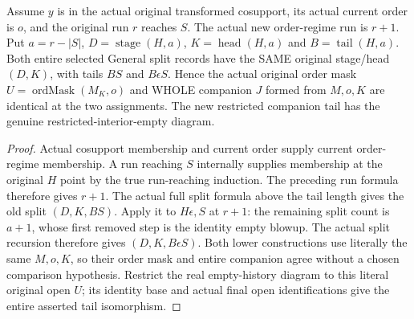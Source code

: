\begin{theorem}
\label{hir:original-interior-general-crossing-splits}
\leanok
{}
Assume $y$ is in the actual original transformed cosupport, its actual
current order is $o$, and the original run $r$ reaches
$S$.  The actual new order-regime run is $r+1$.  Put $a=r-|S|$,
$D=\operatorname{stage}(H,a)$, $K=\operatorname{head}(H,a)$ and
$B=\operatorname{tail}(H,a)$.  Both entire selected General split records
have the SAME original stage/head $(D,K)$, with tails $BS$ and
$B\epsilon S$.  Hence the actual original order mask
$U=\operatorname{ordMask}(M_K,o)$ and WHOLE companion $J$ formed from
$M,o,K$ are identical at the two assignments.  The new restricted
companion tail has the genuine restricted-interior-empty diagram.
\end{theorem}
\begin{proof}
Actual cosupport membership and current order supply current order-regime membership.  A
run reaching $S$ internally supplies membership at the original $H$
point by the true run-reaching induction.  The preceding run formula
therefore gives $r+1$.  The actual full split formula above the tail
length gives the old split $(D,K,BS)$.  Apply it to $H\epsilon,S$ at
$r+1$: the remaining split count is $a+1$, whose first removed step is
the identity empty blowup.  The actual split recursion therefore gives
$(D,K,B\epsilon S)$.  Both lower constructions use literally the same
$M,o,K$, so their order mask and entire companion agree without a chosen
comparison hypothesis.  Restrict the real empty-history diagram to this
literal original open $U$; its identity base and actual final open
identifications give the entire asserted tail isomorphism.
\end{proof}

